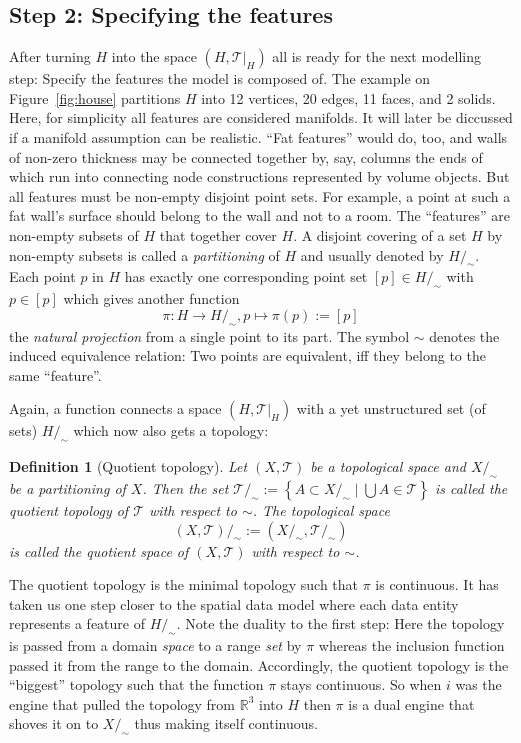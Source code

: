 \documentclass[5p]{elsarticle}
\newtheorem{dfn}{Definition}
\newcommand{\mathpset}[2]{\left\{#1\mid #2\right\}}
\newcommand{\qq}[1]{``#1''}
\begin{document}
\subsection{Step 2: Specifying the features}

After turning $H$ into the space $(H,\mathcal{T}|_H)$ all is ready for the next modelling step: 
Specify the features the model is composed of. 
The example on Figure~\ref{fig:house} partitions $H$ into 12 vertices, 20 edges, 
11 faces, and 2 solids. 
Here, for simplicity all features are considered manifolds. 
It will later be diccussed if a manifold assumption can be realistic. 
\qq{Fat features} would do, too, and walls of non-zero 
thickness may be connected together by, say, columns the ends of which run into 
connecting node constructions represented by volume objects. 
But all features must be non-empty disjoint point sets. 
For example, a point at such a fat wall's surface should belong to the wall and not to a room. 
The \qq{features} are non-empty subsets of $H$ that together cover $H$. 
A disjoint covering of a set $H$ by non-empty subsets is called a \emph{partitioning} of $H$ 
and usually denoted by $H/_{\!\sim}$. Each point $p$ in $H$ has exactly one corresponding 
point set $[p]\in H/_{\!\sim}$ with $p\in[p]$ which gives another function 
$$
  \pi:H\to H/_{\!\sim}, p \mapsto \pi(p) := [p]
$$
the \emph{natural projection} from a single point to its part. 
The symbol $\sim$ denotes the induced equivalence relation: Two points are equivalent, iff 
they belong to the same \qq{feature}. 

Again, a function connects a space $(H,\mathcal{T}|_H)$ with a yet unstructured 
set (of sets) $H/_{\!\sim}$ which now also gets a topology: 

\begin{dfn}[Quotient topology]
Let $(X,\mathcal{T})$ be a topological space and $X/_{\!\sim}$ be a partitioning of $X$. 
Then the set $\mathcal{T}/_{\!\sim} := \mathpset{A\subset X/_{\!\sim}}{\bigcup A \in \mathcal{T}}$ 
is called the \emph{quotient topology} of $\mathcal{T}$ with respect to $\sim$. 
The topological space 
$$
  (X,\mathcal{T})/_{\!\sim} := (X/_{\!\sim},\mathcal{T}/_{\!\sim})
$$ 
is called the \emph{quotient space} of $(X,\mathcal{T})$ with respect to $\sim$.
\end{dfn}

The quotient topology is the minimal topology such that $\pi$ is continuous. 
It has taken us one step closer to the spatial data model where each data entity 
represents a feature of $H/_{\!\sim}$. 
Note the duality to the first step: Here the topology is passed from a domain \emph{space} 
to a range \emph{set} by $\pi$ whereas the inclusion function passed it from the range to the 
domain. 
Accordingly, the quotient topology is the \qq{biggest} topology such that the function 
$\pi$ stays continuous. 
So when $i$ was the engine that pulled the topology from $\mathbb{R}^3$ into $H$ then $\pi$ 
is a dual engine that shoves it on to $X/_{\!\sim}$ thus making itself continuous. 
\end{document}
